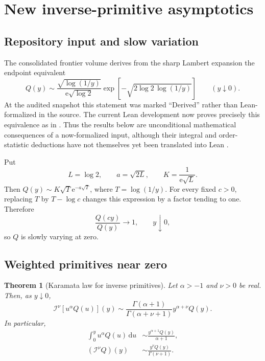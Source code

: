 \documentclass[11pt,oneside]{article}
\newtheorem{theorem}{Theorem}[section]
\theoremstyle{definition}
\theoremstyle{remark}
\newcommand{\dd}{\,\mathrm d}
\newcommand{\e}{\mathrm e}
\newcommand{\RL}{\mathcal I}
\newcommand{\1}{\mathbf 1}
\begin{document}
\section{New inverse-primitive asymptotics}
\label{sec:inverse-asymptotics}

\subsection{Repository input and slow variation}
The consolidated frontier volume derives from the sharp Lambert expansion the
endpoint equivalent
\begin{equation}
 Q(y)\sim
 \frac{\sqrt{\log(1/y)}}{\e\sqrt{\log2}}
 \exp\!\left[-\sqrt{2\log2\,\log(1/y)}\right]
 \qquad(y\downarrow0).                                        \label{eq:Q-asympt-input}
\end{equation}
At the audited snapshot this statement was marked ``Derived'' rather than
Lean-formalized in the source.  The current Lean development now proves
precisely this equivalence as
 in
.  Thus the results below are
unconditional mathematical consequences of a now-formalized input, although
their integral and order-statistic deductions have not themselves yet been
translated into Lean \cite{ProveItFrontiers}.

Put
\begin{equation}
 L=\log2,\qquad a=\sqrt{2L},\qquad K=\frac1{\e\sqrt L}.          \label{eq:Ka}
\end{equation}
Then \(Q(y)\sim K\sqrt T\e^{-a\sqrt T}\), where
\(T=\log(1/y)\).  For every fixed \(c>0\), replacing \(T\) by
\(T-\log c\) changes this expression by a factor tending to one.  Therefore
\begin{equation}
 \frac{Q(cy)}{Q(y)}\longrightarrow1,\qquad y\downarrow0,       \label{eq:Q-slow}
\end{equation}
so \(Q\) is slowly varying at zero.

\subsection{Weighted primitives near zero}

\begin{theorem}[Karamata law for inverse primitives]\label{thm:Q-Karamata}
Let \(\alpha>-1\) and \(\nu>0\) be real.  Then, as \(y\downarrow0\),
\begin{equation}
 \boxed{\quad
 \RL^\nu[u^\alpha Q(u)](y)
 \sim
 \frac{\Gamma(\alpha+1)}{\Gamma(\alpha+\nu+1)}
 y^{\alpha+\nu}Q(y).
 \quad}                                                        \label{eq:Q-weighted-Karamata}
\end{equation}
In particular,
\begin{align}
 \int_0^yu^\alpha Q(u)\dd u
 &\sim\frac{y^{\alpha+1}Q(y)}{\alpha+1},                       \label{eq:Q-first-Karamata}\\
 (\RL^\nu Q)(y)&\sim\frac{y^\nu Q(y)}{\Gamma(\nu+1)}.         \label{eq:Q-fractional-Karamata}
\end{align}
\end{theorem}
\end{document}
